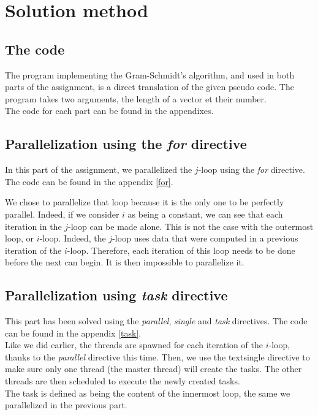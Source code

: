 \chapter{Solution method}

\section{The code}

The program implementing the Gram-Schmidt's algorithm, and used in both parts of the assignment, is a direct translation of the given pseudo code. The program takes two arguments, the length of a vector et their number.\\

The code for each part can be found in the appendixes.

\section{Parallelization using the \textit{for} directive}

In this part of the assignment, we parallelized the $j$-loop using the \textit{for} directive. The code can be found in the appendix \ref{for}.



We chose to parallelize that loop because it is the only one to be perfectly parallel. Indeed, if we consider $i$ as being a constant, we can see that each iteration in the $j$-loop can be made alone. This is not the case with the outermost loop, or $i$-loop. Indeed, the $j$-loop uses data that were computed in a previous iteration of the $i$-loop. Therefore, each iteration of this loop needs to be done before the next can begin. It is then impossible to parallelize it.\\ 

\section{Parallelization using \textit{task} directive}

This part has been solved using the \textit{parallel}, \textit{single} and \textit{task} directives. The code can be found in the appendix \ref{task}.\\

Like we did earlier, the threads are spawned for each iteration of the $i$-loop, thanks to the \textit{parallel} directive this time. Then, we use the text{single} directive to make sure only one thread (the master thread) will create the tasks. The other threads are then scheduled to execute the newly created tasks.\\ 

The task is defined as being the content of the innermost loop, the same we parallelized in the previous part. \\
